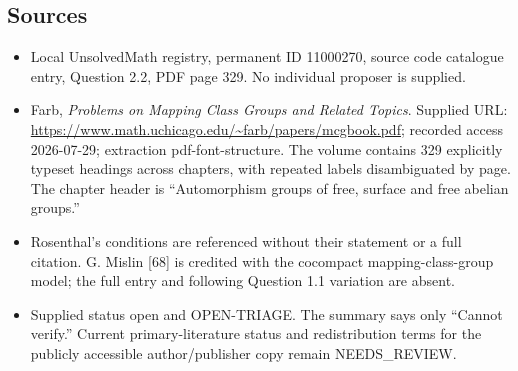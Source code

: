\documentclass[11pt]{article}
\begin{document}
\subsection{Sources}
\begin{itemize}
\item Local UnsolvedMath registry, permanent ID 11000270, source code catalogue entry, Question 2.2, PDF page 329. No individual proposer is supplied.
\item Farb, \emph{Problems on Mapping Class Groups and Related Topics}. Supplied URL: \url{https://www.math.uchicago.edu/~farb/papers/mcgbook.pdf}; recorded access 2026-07-29; extraction pdf-font-structure. The volume contains 329 explicitly typeset headings across chapters, with repeated labels disambiguated by page. The chapter header is ``Automorphism groups of free, surface and free abelian groups.''
\item Rosenthal's conditions are referenced without their statement or a full citation. G. Mislin [68] is credited with the cocompact mapping-class-group model; the full entry and following Question 1.1 variation are absent.
\item Supplied status open and OPEN-TRIAGE. The summary says only ``Cannot verify.'' Current primary-literature status and redistribution terms for the publicly accessible author/publisher copy remain NEEDS\_REVIEW.
\end{itemize}
\end{document}
